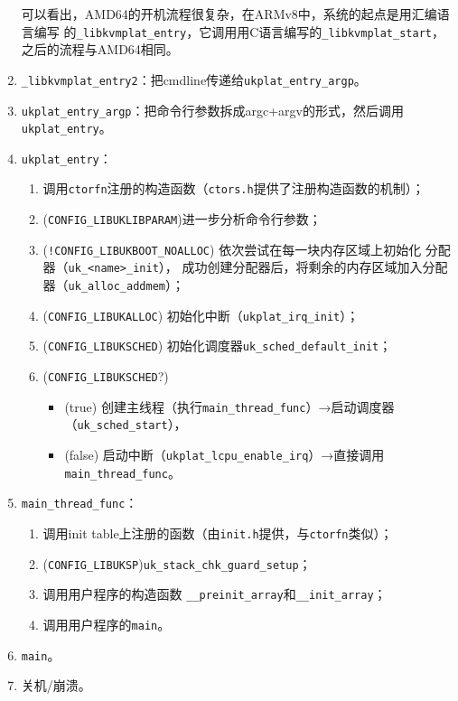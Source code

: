 \documentclass{../runikraft-report}
\begin{document}
\begin{enumerate}
\begin{enumerate}
    \end{enumerate}
    可以看出，AMD64的开机流程很复杂，在ARMv8中，系统的起点是用汇编语言编写
    的\texttt{\_libkvmplat\_entry}，它调用用C语言编写的\texttt{\_libkvmplat\_start}，
    之后的流程与AMD64相同。
\item \texttt{\_libkvmplat\_entry2}：把cmdline传递给\texttt{ukplat\_entry\_argp}。
\item \texttt{ukplat\_entry\_argp}：把命令行参数拆成argc+argv的形式，然后调用\texttt{ukplat\_entry}。
\item \texttt{ukplat\_entry}：
    \begin{enumerate}
    \item 调用\texttt{ctorfn}注册的构造函数（\texttt{ctors.h}提供了注册构造函数的机制）；
    \item (\texttt{CONFIG\_LIBUKLIBPARAM})进一步分析命令行参数；
    \item (\texttt{!CONFIG\_LIBUKBOOT\_NOALLOC}) 依次尝试在每一块内存区域上初始化
    分配器\linebreak（\texttt{uk\_<name>\_init}），
    成功创建分配器后，将剩余的内存区域加入分配器\linebreak（\texttt{uk\_alloc\_addmem}）；
    \item (\texttt{CONFIG\_LIBUKALLOC}) 初始化中断（\texttt{ukplat\_irq\_init}）；
    \item (\texttt{CONFIG\_LIBUKSCHED}) 初始化调度器\texttt{uk\_sched\_default\_init}；
    \item (\texttt{CONFIG\_LIBUKSCHED}?)
        \begin{itemize}
        \item (true)  创建主线程（执行\texttt{main\_thread\_func}）→启动调度器（\texttt{uk\_sched\_start}），
        \item (false) 启动中断（\texttt{ukplat\_lcpu\_enable\_irq}）→直接调用\texttt{main\_thread\_func}。
        \end{itemize}
    \end{enumerate}
\item \texttt{main\_thread\_func}：
    \begin{enumerate}
    \item 调用init table上注册的函数（由\texttt{init.h}提供，与\texttt{ctorfn}类似）；
    \item (\texttt{CONFIG\_LIBUKSP})\texttt{uk\_stack\_chk\_guard\_setup}；
    \item 调用用户程序的构造函数 \texttt{\_\_preinit\_array}和\texttt{\_\_init\_array}；
    \item 调用用户程序的\texttt{main}。
    \end{enumerate}
\item \texttt{main}。
\item 关机/崩溃。
\end{enumerate}
\end{document}
